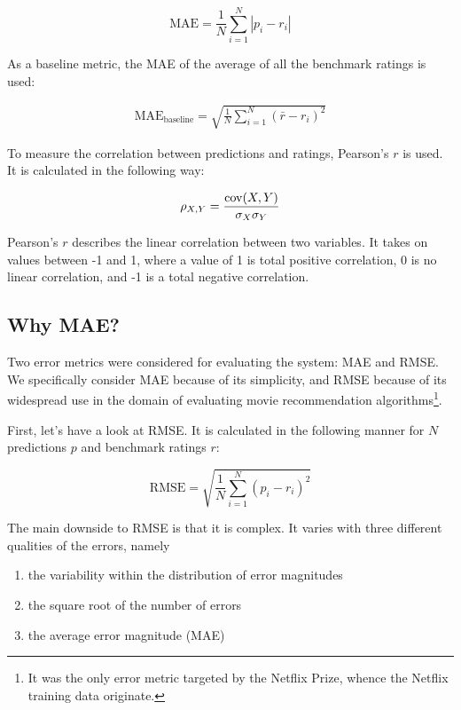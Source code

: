 \begin{equation}
  \text{MAE} = \frac{1}{N} \sum_{i=1}^N |p_i - r_i|
  \label{eq:mae}
\end{equation}

As a baseline metric, the MAE of the average of all the benchmark ratings is used:

\begin{align}
  \text{MAE}_\text{baseline} = \sqrt{ \frac{1}{N} \sum_{i=1}^N (\bar{r} - r_i)^2 }
\end{align}

To measure the correlation between predictions and ratings, Pearson's $r$ is used. It is calculated in the following way:

\begin{equation}
  \rho_{X,Y} = \frac{\operatorname{cov}(X, Y)}{\sigma_X \sigma_Y}
\end{equation}

Pearson's $r$ describes the linear correlation between two variables. It takes on values between -1 and 1, where a value of 1 is total positive correlation, 0 is no linear correlation, and -1 is a total negative correlation.

\subsection{Why MAE?} %
\label{sub:why_mae}

Two error metrics were considered for evaluating the system: MAE and RMSE. We specifically consider MAE because of its simplicity, and RMSE because of its widespread use in the domain of evaluating movie recommendation algorithms\footnote{It was the only error metric targeted by the Netflix Prize, whence the Netflix training data originate.}.

First, let's have a look at RMSE. It is calculated in the following manner for $N$ predictions $p$ and benchmark ratings $r$:

\begin{equation}
  \text{RMSE} = \sqrt{ \frac{1}{N} \sum_{i=1}^N (p_i - r_i)^2 }
\end{equation}

The main downside to RMSE is that it is complex. It varies with three different qualities of the errors, namely

\begin{enumerate}
  \item the variability within the distribution of error magnitudes
  \item the square root of the number of errors
  \item the average error magnitude (MAE)
\end{enumerate}

